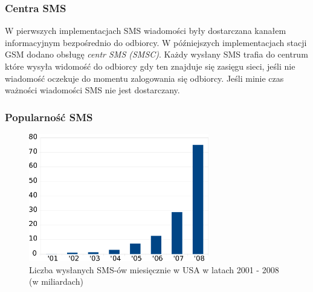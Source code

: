 \documentclass[xcolor=table]{beamer}
\begin{document}
\begin{frame}
  \frametitle{Centra SMS}

  W pierwszych implementacjach SMS wiadomości były dostarczana kanałem
  informacyjnym bezpośrednio do odbiorcy. W późniejszych implementacjach stacji
  GSM dodano obsługę \emph{centr SMS (SMSC)}. Każdy wysłany SMS trafia do
  centrum które wysyła widomość do odbiorcy gdy ten znajduje się zasięgu sieci,
  jeśli nie wiadomość oczekuje do momentu zalogowania się odbiorcy. Jeśli minie
  czas ważności wiadomości SMS nie jest dostarczany.
\end{frame}

\begin{frame}
  \frametitle{Popularność SMS}

  \begin{center}
    \begin{figure}
      \includegraphics[width=0.7\textwidth]{sms_sent_monthly}
      \caption{Liczba wysłanych SMS-ów miesięcznie w USA w latach 2001 - 2008
      (w miliardach)}
    \end{figure}
  \end{center}
\end{frame}


\end{document}
